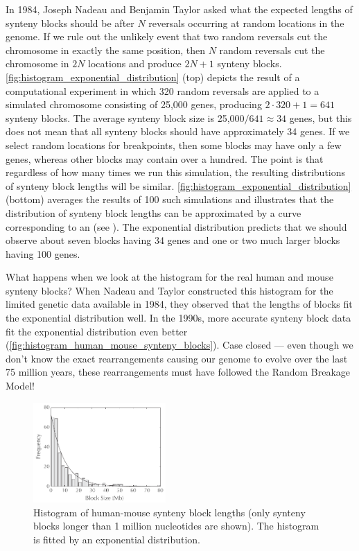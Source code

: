 In 1984, Joseph Nadeau and Benjamin Taylor asked what the expected lengths of synteny blocks should be after $N$ reversals occurring at random locations in the genome.  If we rule out the unlikely event that two random reversals cut the chromosome in exactly the same position, then $N$ random reversals cut the chromosome in $2N$ locations and produce $2N + 1$ synteny blocks. \autoref{fig:histogram_exponential_distribution} (top) depicts the result of a computational experiment in which 320 random reversals are applied to a simulated chromosome consisting of 25,000 genes, producing $2 \cdot 320+1 = 641$ synteny blocks. The average synteny block size is 25,000$/641 \approx 34$ genes, but this does not mean that all synteny blocks should have approximately 34 genes. If we select random locations for breakpoints, then some blocks may have only a few genes, whereas other blocks may contain over a hundred.  The point is that regardless of how many times we run this simulation, the resulting distributions of synteny block lengths will be similar. \autoref{fig:histogram_exponential_distribution} (bottom) averages the results of 100 such simulations and illustrates that the distribution of synteny block lengths can be approximated by a curve corresponding to an  (see ).  The exponential distribution predicts that we should observe about seven blocks having 34 genes and one or two much larger blocks having 100 genes.

What happens when we look at the histogram for the real human and mouse synteny blocks? When Nadeau and Taylor constructed this histogram for the limited genetic data available in 1984, they observed that the lengths of blocks fit the exponential distribution well.  In the 1990s, more accurate synteny block data fit the exponential distribution even better (\autoref{fig:histogram_human_mouse_synteny_blocks}). Case closed --- even though we don't know the exact rearrangements causing our genome to evolve over the last 75 million years, these rearrangements must have followed the Random Breakage Model!\\

\begin{figure}[h]
\mySfFamily
\centering
\includegraphics[width=0.45\textwidth]{images/rearrangements/histogram_human_mouse_synteny_blocks}
\caption{Histogram of human-mouse synteny block lengths (only synteny blocks longer than 1 million nucleotides are shown). The histogram is fitted by an exponential distribution.}
\label{fig:histogram_human_mouse_synteny_blocks}
\end{figure}

